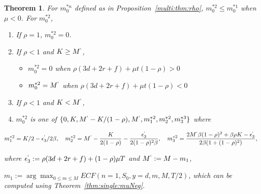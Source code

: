 \documentclass[11pt]{article}
\theoremstyle{plain}
\numberwithin{equation}{section}
\newtheorem{thm}{Theorem}[section]
\begin{document}
\begin{thm}
	For $m_0^{*n}$ defined as in Proposition~\ref{multi:thm:rho},  $m_0^{*2}\leq m_0^{*1}$  when $\mu<0$.
	For $m_0^{*2}$, 


\begin{enumerate}
	\item If $\rho=1$, $m_0^{*2}=0$.
	\item If $\rho<1$ and $K\geq M^{`}$,
		\begin{itemize}
			\item $m_0^{*2}=0$ when $\rho(3d+2r+f)+\mu t(1-\rho)>0$
			\item $m_0^{*2}=M^{`}$ when $\rho(3d+2r+f)+\mu t(1-\rho)<0$
		\end{itemize}
	\item If $\rho<1$ and $K< M^{`}$,	
	\item[] $m_0^{*2}$ is one of $\{0,K, M^{`}-K/(1-\rho), M^{`}, m^{*2}_1, m^{*2}_2, m^{*3}_3\}$ where  
\end{enumerate}

$$ 
m^{*2}_1=K/2-\epsilon_3^{`}/2\beta, \quad
m^{*2}_2=M^{`}-\frac{K}{2(1-\rho)}-\frac{\epsilon_3^{`}}{2(1-\rho)^2\beta},
\quad 
m^{*2}_3=\frac{2M^{`}\beta (1-\rho)^2 +\beta\rho K-\epsilon_3^{`}}{2\beta(1+(1-\rho)^2)},
$$ 

where
 $\epsilon_3^{`}:=\rho(3d+2r+f)+(1-\rho)\mu T$ and $M^{`}:=M-m_1$, 

$m_1:=\arg\max_{0\leq m\leq M} ECF(n=1,S_0,y=d,m, M, T/2)$, which can be computed using Theorem~\ref{thm:single:muNeg}. 
	
	
	
\end{thm}
\end{document}
